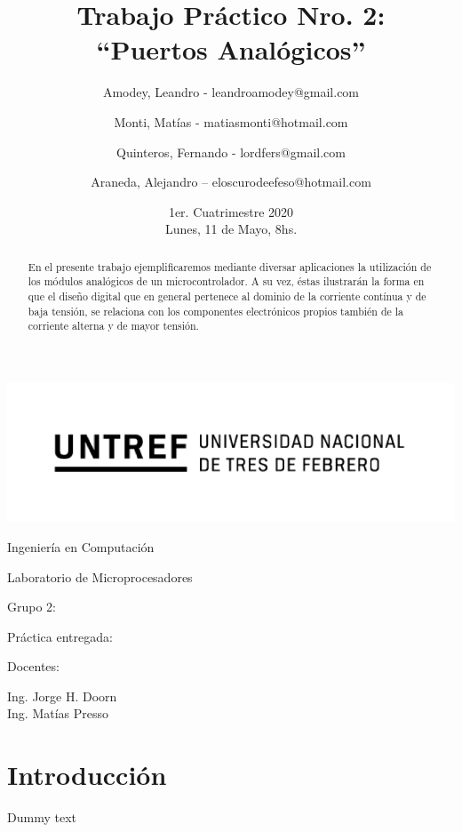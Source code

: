 \documentclass{article}
\title{Trabajo Práctico Nro. 2:\\“Puertos Analógicos”}
\author{Amodey, Leandro - leandroamodey@gmail.com
\and Monti, Matías - matiasmonti@hotmail.com
\and Quinteros, Fernando - lordfers@gmail.com
\and Araneda, Alejandro – eloscurodeefeso@hotmail.com}
\date{1er. Cuatrimestre 2020\\Lunes, 11 de Mayo, 8hs.}
\def\teacher{Ing. Jorge H. Doorn\\Ing. Matías Presso}
\begin{document}
\begin{titlepage}
\makeatletter 
\centering
\includegraphics{logo.png}\par
{\Large Ingeniería en Computación \par}
\vspace{0.5cm}
{\LARGE Laboratorio de Microprocesadores \par}
\vfill
{\huge \@title \par}
\vfill
Grupo 2:\par
{\renewcommand{\and}{\par}\@author}
\vfill
Práctica entregada:\par
\@date
\vfill
Docentes:\par
\teacher
\vspace{1cm}
\makeatother
\end{titlepage}

\renewcommand{\abstractname}{Resumen}
\begin{abstract}
En el presente trabajo ejemplificaremos mediante diversar aplicaciones 
la utilización de los módulos analógicos de un microcontrolador. A su 
vez, éstas ilustrarán la forma en que el diseño digital que en general 
pertenece al dominio de la corriente contínua y de baja tensión, se 
relaciona con los componentes electrónicos propios también de la 
corriente alterna y de mayor tensión.
\end{abstract}

\section{Introducción}
Dummy text
\end{document}
